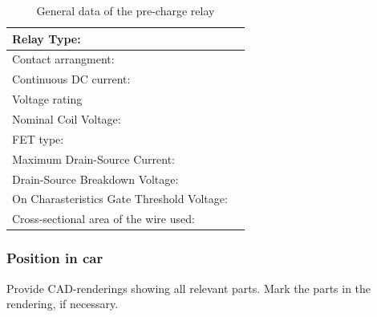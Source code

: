 \begin{table}[H]
	\centering
	\caption{General data of the pre-charge relay}
	\begin{tabularx}{\textwidth}{|X|X|}
		\hline
		Relay Type: & \\[\TableSize]
		\hline
		Contact arrangment: &  \\[\TableSize]
		\hline
		Continuous DC current:  & \\[\TableSize]
		\hline
		Voltage rating  & \\[\TableSize]
		\hline
		Nominal Coil Voltage: &  \\[\TableSize]
		\hline
		FET type: &  \\[\TableSize]
		\hline
		Maximum Drain-Source Current: &  \\[\TableSize]
		\hline
		Drain-Source Breakdown Voltage: &  \\[\TableSize]
		\hline
		On Charasteristics Gate Threshold Voltage: & \\[\TableSize]
		\hline
		Cross-sectional area of the wire used: & \\[\TableSize]
		\hline
	\end{tabularx}%
	\label{tab:precharge-relay}%
\end{table}%

\subsubsection{Position in car}
Provide CAD-renderings showing all relevant parts. Mark the parts in the rendering, if necessary.
